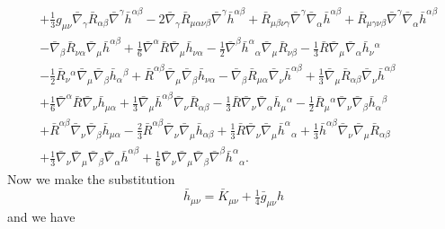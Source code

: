 \documentclass[10pt,letterpaper]{article}
\newcommand{\be}{\begin{equation}} %
\newcommand{\ee}{\end{equation}} %
\begin{document}
\begin{align}
& + \tfrac{1}{3} g_{\mu \nu} \bar\nabla_{\gamma}\bar R_{\alpha \beta} \bar\nabla^{\gamma}\bar h^{\alpha \beta}
 - 2 \bar\nabla_{\gamma}\bar R_{\mu \alpha \nu \beta} \bar\nabla^{\gamma}\bar h^{\alpha \beta}
 + \bar R_{\mu \beta \nu \gamma} \bar\nabla^{\gamma}\bar\nabla_{\alpha}\bar h^{\alpha \beta}
 + \bar R_{\mu \gamma \nu \beta} \bar\nabla^{\gamma}\bar\nabla_{\alpha}\bar h^{\alpha \beta}\nonumber\\
& -  \bar\nabla_{\beta}\bar R_{\nu \alpha} \bar\nabla_{\mu}\bar h^{\alpha \beta}
 + \tfrac{1}{6} \bar\nabla^{\alpha}\bar R \bar\nabla_{\mu}\bar h_{\nu \alpha}
 -  \tfrac{1}{2} \bar\nabla^{\beta}\bar h^{\alpha}{}_{\alpha} \bar\nabla_{\mu}\bar R_{\nu \beta}
 -  \tfrac{1}{3} \bar R \bar\nabla_{\mu}\bar\nabla_{\alpha}\bar h_{\nu}{}^{\alpha}\nonumber\\
& -  \tfrac{1}{2} \bar R_{\nu}{}^{\alpha} \bar\nabla_{\mu}\bar\nabla_{\beta}\bar h_{\alpha}{}^{\beta}
 + \bar R^{\alpha \beta} \bar\nabla_{\mu}\bar\nabla_{\beta}\bar h_{\nu \alpha}
 -  \bar\nabla_{\beta}\bar R_{\mu \alpha} \bar\nabla_{\nu}\bar h^{\alpha \beta}
 + \tfrac{1}{3} \bar\nabla_{\mu}\bar R_{\alpha \beta} \bar\nabla_{\nu}\bar h^{\alpha \beta}\nonumber\\
& + \tfrac{1}{6} \bar\nabla^{\alpha}\bar R \bar\nabla_{\nu}\bar h_{\mu \alpha}
 + \tfrac{1}{3} \bar\nabla_{\mu}\bar h^{\alpha \beta} \bar\nabla_{\nu}\bar R_{\alpha \beta}
 -  \tfrac{1}{3} \bar R \bar\nabla_{\nu}\bar\nabla_{\alpha}\bar h_{\mu}{}^{\alpha}
 -  \tfrac{1}{2} \bar R_{\mu}{}^{\alpha} \bar\nabla_{\nu}\bar\nabla_{\beta}\bar h_{\alpha}{}^{\beta}\nonumber\\
& + \bar R^{\alpha \beta} \bar\nabla_{\nu}\bar\nabla_{\beta}\bar h_{\mu \alpha}
 -  \tfrac{2}{3} \bar R^{\alpha \beta} \bar\nabla_{\nu}\bar\nabla_{\mu}\bar h_{\alpha \beta}
 + \tfrac{1}{3} \bar R \bar\nabla_{\nu}\bar\nabla_{\mu}\bar h^{\alpha}{}_{\alpha}
 + \tfrac{1}{3} \bar h^{\alpha \beta} \bar\nabla_{\nu}\bar\nabla_{\mu}\bar R_{\alpha \beta}\nonumber\\
& + \tfrac{1}{3} \bar\nabla_{\nu}\bar\nabla_{\mu}\bar\nabla_{\beta}\bar\nabla_{\alpha}\bar h^{\alpha \beta}
 + \tfrac{1}{6} \bar\nabla_{\nu}\bar\nabla_{\mu}\bar\nabla_{\beta}\bar\nabla^{\beta}\bar h^{\alpha}{}_{\alpha}.
\end{align}
Now we make the substitution
\be
	\bar h_{\mu\nu} = \bar K_{\mu\nu} + \tfrac14 \bar g_{\mu\nu} h
\ee
and we have
\end{document}
